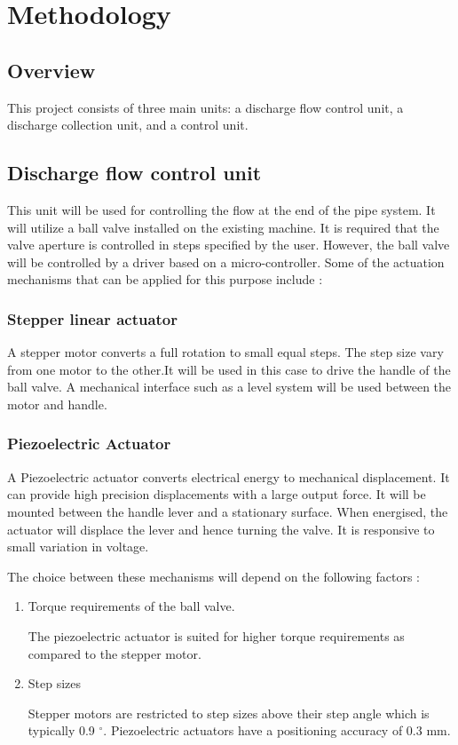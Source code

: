 \section{Methodology}
\subsection{Overview}
This project consists of three main units: a discharge flow control unit, a discharge collection  unit, and a control unit. 
\subsection{Discharge flow control unit}
This unit will be used for controlling the flow at the end of the pipe system. It will utilize a ball valve installed on the existing machine. It is required that the valve aperture is controlled in steps specified by the user. However, the ball valve will be controlled by a driver based on a micro-controller. Some of the actuation mechanisms that can be applied for this purpose include :

\subsubsection{Stepper linear actuator}

A stepper motor converts a full rotation to small equal steps. The step size vary from one motor to the other.It will be used in this case to drive the handle of the ball valve. A mechanical interface such as a level system will be used between the motor and handle.

\subsubsection{Piezoelectric Actuator}

A Piezoelectric actuator converts electrical energy to mechanical displacement. It can provide high precision displacements with a large output force. It will be mounted between the handle lever and a stationary surface. When energised, the actuator will displace the lever and hence turning the valve. It is responsive to small variation in voltage.

\par

The choice between these mechanisms will depend on the following factors :
\begin{enumerate}
    \item Torque requirements  of the ball valve. 
    \par The piezoelectric actuator is suited for higher torque requirements as compared to the stepper motor. 
    \item Step sizes
    \par Stepper motors are restricted to step sizes above their step angle which is typically 0.9 $^{\circ}$. Piezoelectric actuators have a positioning accuracy of 0.3 mm.
\end{enumerate}

